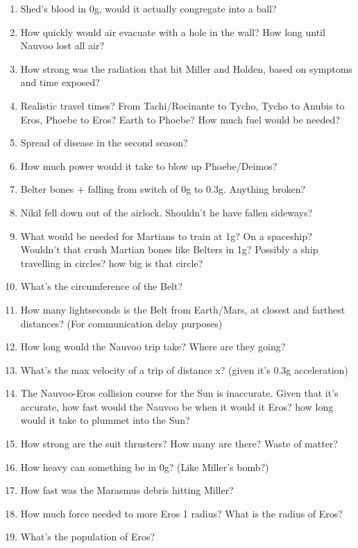 \documentclass{amsart}
\theoremstyle{definition}
\begin{document}
\begin{enumerate}
    \item Shed's blood in 0g, would it actually congregate into a ball?
    \item How quickly would air evacuate with a hole in the wall?
    \subitem How long until Nauvoo lost all air?
    \item How strong was the radiation that hit Miller and Holden, based on symptoms and time exposed?
    \item Realistic travel times? From Tachi/Rocinante to Tycho, Tycho to Anubis to Eros, Phoebe to Eros? Earth to Phoebe?
    \subitem How much fuel would be needed?
    \item Spread of disease in the second season?
    \item How much power would it take to blow up Phoebe/Deimos?
    \item Belter bones + falling from switch of 0g to 0.3g. Anything broken?
    \item Nikil fell down out of the airlock. Shouldn't he have fallen sideways?
    \item What would be needed for Martians to train at 1g? On a spaceship? Wouldn't that crush Martian bones like Belters in 1g?
    \subitem Possibly a ship travelling in circles? how big is that circle?
    \item What's the circumference of the Belt?
    \item How many lightseconds is the Belt from Earth/Mars, at closest and farthest distances? (For communication delay purposes)
    \item How long would the Nauvoo trip take? Where are they going?
    \item What's the max velocity of a trip of distance x? (given it's 0.3g acceleration)
    \item The Nauvoo-Eros collision course for the Sun is inaccurate.
    \subitem Given that it's accurate, how fast would the Nauvoo be when it would it Eros?
    \subitem how long would it take to plummet into the Sun?
    \item How strong are the suit thrusters? How many are there? Waste of matter?
    \item How heavy can something be in 0g? (Like Miller's bomb?)
    \item How fast was the Marasmus debris hitting Miller?
    \item How much force needed to more Eros 1 radius?
    \subitem What is the radius of Eros?
    \item What's the population of Eros?

\end{enumerate}
\end{document}
